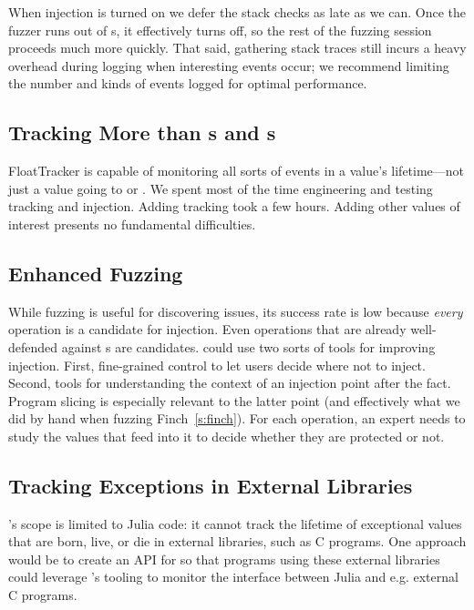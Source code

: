 \documentclass{juliacon}
\begin{document}
When injection is turned on we defer the stack checks as late as we can.
Once the fuzzer runs out of \NaN{}s, it effectively turns off, so the rest of the fuzzing session proceeds much more quickly.
That said, gathering stack traces still incurs a heavy overhead during logging when interesting events occur;
we recommend limiting the number and kinds of events logged for optimal performance.

\subsection{Tracking More than \NaN{}s and \Inf{}s}

FloatTracker is capable of monitoring all sorts of events in a \fp{} value's lifetime---not just a value going to \NaN{} or \Inf{}.
We spent most of the time engineering and testing \NaN{} tracking and injection.
Adding \Inf{} tracking took a few hours.
Adding other values of interest presents no fundamental difficulties.

\subsection{Enhanced Fuzzing}

While fuzzing is useful for discovering issues, its success rate
is low because \emph{every} \fp{} operation is a candidate
for injection.
Even operations that are already well-defended against \NaN{}s are candidates.
\FT{} could use two sorts of tools for improving injection.
First, fine-grained control to let users decide where not to inject.
Second, tools for understanding the context of an injection point
after the fact.
Program slicing is especially relevant to the latter point (and effectively
what we did by hand when fuzzing Finch~\cref{s:finch}).
For each operation, an expert needs to study the values that feed into it to
decide whether they are protected or not.


\subsection{Tracking Exceptions in External Libraries}

\FT{}'s scope is limited to Julia code: it cannot track the lifetime of exceptional values that are born, live, or die in external libraries, such as C programs.
One approach would be to create an API for \FT{} so that programs using these external libraries could leverage \FT{}'s tooling to monitor the interface between Julia and e.g. external C programs.
\end{document}
